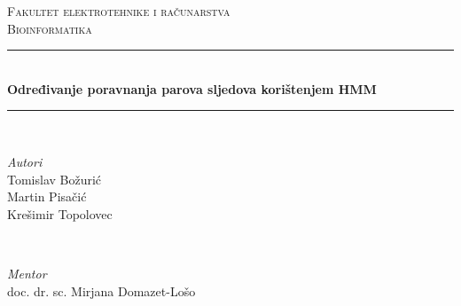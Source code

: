\documentclass[a4paper]{article}
\begin{document}

\begin{titlepage} %
	\newcommand{\HRule}{\rule{\linewidth}{0.5mm}} %
	
	\center %
	
	
	\textsc{\LARGE Fakultet elektrotehnike i računarstva}\\[1.5cm] %
	
	\textsc{\Large Bioinformatika}\\[0.5cm] %
	
	
	
	
	\HRule\\[0.4cm]
	
	{\huge\bfseries Određivanje poravnanja parova sljedova korištenjem HMM}\\[0.4cm] %
	
	\HRule\\[1.5cm]
	
	
	\begin{minipage}{0.4\textwidth}
		\begin{flushleft}
			\large
			\textit{Autori}\\
			 {Tomislav Božurić}\\
			 {Martin Pisačić}\\
			 {Krešimir Topolovec} %
		\end{flushleft}
	\end{minipage}
	~
	\begin{minipage}{0.4\textwidth}
		\begin{flushright}
			\large
			\textit{Mentor}\\
			 doc. dr. sc. {Mirjana Domazet-Lošo} %
		\end{flushright}
	\end{minipage}
	

\end{titlepage}
\end{document}
